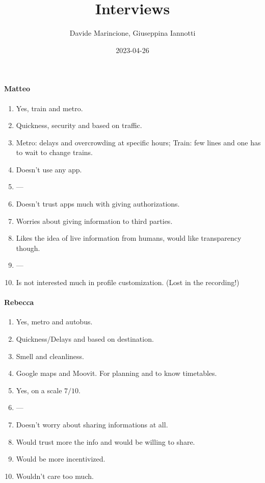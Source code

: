 \documentclass[a4paper, 10pt]{article}
\title{Interviews}
\author{Davide Marincione, Giuseppina Iannotti}
\date{2023-04-26}
\begin{document}
\maketitle
\paragraph*{Matteo}
\begin{enumerate}
    \item Yes, train and metro. 
    \item Quickness, security and based on traffic.
    \item Metro: delays and overcrowding at specific hours; Train: few lines and one has to wait to change trains. 
    \item Doesn't use any app.
    \item ---
    \item Doesn't trust apps much with giving authorizations.
    \item Worries about giving information to third parties.
    \item Likes the idea of live information from humans, would like transparency though.
    \item ---
    \item Is not interested much in profile customization. (Lost in the recording!)
\end{enumerate}

\paragraph*{Rebecca}
\begin{enumerate}
    \item Yes, metro and autobus.
    \item Quickness/Delays and based on destination.
    \item Smell and cleanliness.
    \item Google maps and Moovit. For planning and to know timetables.
    \item Yes, on a scale $7/10$.
    \item ---
    \item Doesn't worry about sharing informations at all.
    \item Would trust more the info and would be willing to share.
    \item Would be more incentivized.
    \item Wouldn't care too much.
\end{enumerate}
\end{document}
